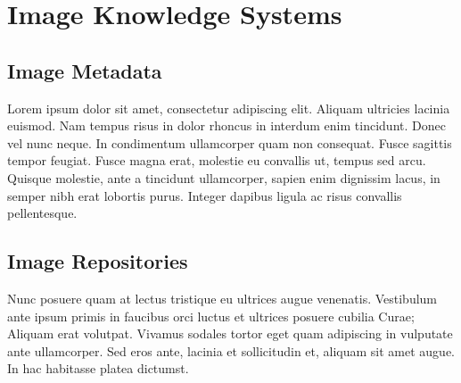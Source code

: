 
\chapter{Image Knowledge Systems} %

\label{Chapter2} %



\section{Image Metadata}

Lorem ipsum dolor sit amet, consectetur adipiscing elit. Aliquam
ultricies lacinia euismod. Nam tempus risus in dolor rhoncus in
interdum enim tincidunt. Donec vel nunc neque. In condimentum
ullamcorper quam non consequat. Fusce sagittis tempor feugiat. Fusce
magna erat, molestie eu convallis ut, tempus sed arcu. Quisque
molestie, ante a tincidunt ullamcorper, sapien enim dignissim lacus,
in semper nibh erat lobortis purus. Integer dapibus ligula ac risus
convallis pellentesque.


\section{Image Repositories}

Nunc posuere quam at lectus tristique eu ultrices augue
venenatis. Vestibulum ante ipsum primis in faucibus orci luctus et
ultrices posuere cubilia Curae; Aliquam erat volutpat. Vivamus sodales
tortor eget quam adipiscing in vulputate ante ullamcorper. Sed eros
ante, lacinia et sollicitudin et, aliquam sit amet augue. In hac
habitasse platea dictumst.
